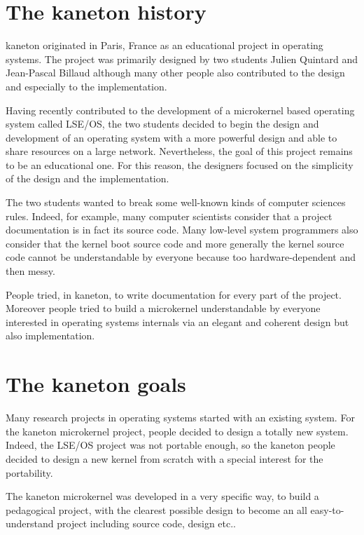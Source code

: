 {\begin{multicols}{2}
\section{The kaneton history}

kaneton originated in Paris, France as an educational project in operating
systems. The project was primarily designed by two students Julien Quintard
and Jean-Pascal Billaud although many other people also contributed to
the design and especially to the implementation.

Having recently contributed to the development of a microkernel based
operating system called LSE/OS, the two students decided to begin the
design and development of an operating system with a more powerful design
and able to share resources on a large network. Nevertheless, the goal of
this project remains to be an educational one. For this reason, the
designers focused on the simplicity of the design and the implementation.

The two students wanted to break some well-known kinds of computer sciences
rules. Indeed, for example, many computer scientists consider that a
project documentation is in fact its source code. Many low-level system
programmers also consider that the kernel boot source code and more
generally the kernel source code cannot be understandable by everyone
because too hardware-dependent and then messy.

People tried, in kaneton, to write documentation for every part of the
project. Moreover people tried to build a microkernel understandable
by everyone interested in operating systems internals via an elegant
and coherent design but also implementation.

%
%

\section{The kaneton goals}

Many research projects in operating systems started with an existing system.
For the kaneton microkernel project, people decided to design a totally
new system. Indeed, the LSE/OS project was not portable enough, so the
kaneton people decided to design a new kernel from scratch with a
special interest for the portability.

The kaneton microkernel was developed in a very specific way, to build
a pedagogical project, with the clearest possible design to become an
all easy-to-understand project including source code, design etc..


\end{multicols}}
